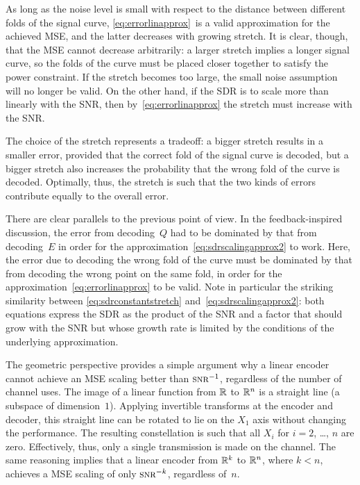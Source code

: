 As long as the noise level is small with respect to the distance between
different folds of the signal curve, \eqref{eq:errorlinapprox}~is a valid
approximation for the achieved MSE, and the latter decreases with growing
stretch. It is clear, though, that the MSE cannot decrease arbitrarily: a
larger stretch implies a longer signal curve, so the folds of the curve must be
placed closer together to satisfy the power constraint. If the stretch becomes
too large, the small noise assumption will no longer be valid.  On the other
hand, if the SDR is to scale more than linearly with the SNR, then
by~\eqref{eq:errorlinapprox} the stretch must increase with the SNR.

The choice of the stretch represents a tradeoff: a bigger stretch results in a
smaller error, provided that the correct fold of the signal curve is decoded,
but a bigger stretch also increases the probability that the wrong fold of the
curve is decoded. Optimally, thus, the stretch is such that the two kinds of
errors contribute equally to the overall error. 

There are clear parallels to the previous point of view. In the
feedback-inspired discussion, the error from decoding~$Q$ had to be dominated by
that from decoding~$E$ in order for the
approximation~\eqref{eq:sdrscalingapprox2} to work. Here, the error due to
decoding the wrong fold of the curve must be dominated by that from decoding the
wrong point on the same fold, in order for the
approximation~\eqref{eq:errorlinapprox} to be valid. Note in particular the
striking similarity between \eqref{eq:sdrconstantstretch}
and~\eqref{eq:sdrscalingapprox2}: both equations express the SDR as the product
of the SNR and a factor that should grow with the SNR but whose growth rate is
limited by the conditions of the underlying approximation. 

\begin{remark}
  The geometric perspective provides a simple argument why a linear encoder
  cannot achieve an MSE scaling better than $\snr^{-1}$, regardless of the
  number of channel uses. The image of a linear function from $\mathbb{R}$ to $\mathbb{R}^n$ is
  a straight line (a subspace of dimension~$1$). Applying invertible transforms
  at the encoder and decoder, this straight line can be rotated to lie on the
  $X_1$ axis without changing the performance. The resulting constellation is
  such that all $X_i$ for $i = 2$, \dots, $n$ are zero. Effectively, thus, only
  a single transmission is made on the channel. The same reasoning implies that
  a linear encoder from $\mathbb{R}^k$ to $\mathbb{R}^n$, where $k < n$, achieves a MSE scaling
  of only $\snr^{-k}$, regardless of~$n$. 
\end{remark}


